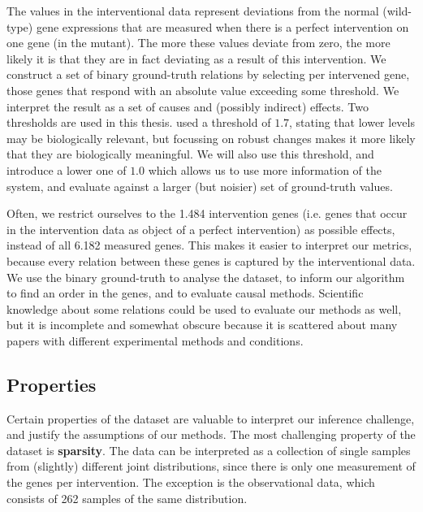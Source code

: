 The values in the interventional data represent deviations from the normal (wild-type) gene expressions that are measured when there is a perfect intervention on one gene (in the mutant). The more these values deviate from zero, the more likely it is that they are in fact deviating as a result of this intervention. We construct a set of binary ground-truth relations by selecting per intervened gene, those genes that respond with an absolute value exceeding some threshold. We interpret the result as a set of causes and (possibly indirect) effects. Two thresholds are used in this thesis. \citet{kemmeren2014large} used a threshold of $1.7$, stating that lower levels may be biologically relevant, but focussing on robust changes makes it more likely that they are biologically meaningful. We will also use this threshold, and introduce a lower one of $1.0$ which allows us to use more information of the system, and evaluate against a larger (but noisier) set of ground-truth values. 

Often, we restrict ourselves to the 1.484 intervention genes (i.e. genes that occur in the intervention data as object of a perfect intervention) as possible effects, instead of all 6.182 measured genes. This makes it easier to interpret our metrics, because every relation between these genes is captured by the interventional data. We use the binary ground-truth to analyse the dataset, to inform our algorithm to find an order in the genes, and to evaluate causal methods. Scientific knowledge about some relations could be used to evaluate our methods as well, but it is incomplete and somewhat obscure because it is scattered about many papers with different experimental methods and conditions. 

\subsection{Properties}

Certain properties of the dataset are valuable to interpret our inference challenge, and justify the assumptions of our methods. The most challenging property of the dataset is \textbf{sparsity}. The data can be interpreted as a collection of single samples from (slightly) different joint distributions, since there is only one measurement of the genes per intervention. The exception is the observational data, which consists of 262 samples of the same distribution.

